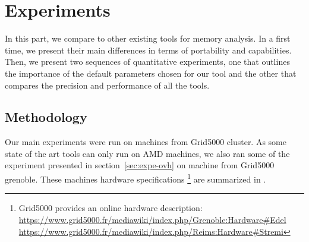 \section{Experiments}
\label{sec:expe}

In this part, we compare \Moca to other existing tools for memory analysis. In a first time, we present their main differences in terms of portability
and capabilities. Then, we present two sequences of quantitative experiments, one that outlines the importance of the default parameters chosen for our tool
and the other that compares the precision and performance of all the tools.


\subsection{Methodology}
\label{sec:exp-methodo}


Our main experiments were run on  machines from Grid5000 \Edel
cluster.
    As some state of the art tools can only run on AMD machines, we also ran
    some of the experiment presented in section~\ref{sec:expe-ovh} on
    \Stremi machine from Grid5000 grenoble.
    These machines hardware specifications
   \footnote{Grid5000 provides an online hardware description:\\
       \url{https://www.grid5000.fr/mediawiki/index.php/Grenoble:Hardware\#Edel}
       \\\url{https://www.grid5000.fr/mediawiki/index.php/Reims:Hardware\#Stremi}}
    are summarized in .

